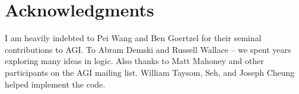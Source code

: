 \documentclass[12pt]{article}
\begin{document}
\section*{Acknowledgments}

I am heavily indebted to Pei Wang \cite{Wang2006} \cite{Wang2013} and Ben Goertzel \cite{Goertzel2011} for their seminal contributions to AGI.  To Abram Demski and Russell Wallace -- we spent years exploring many ideas in logic.  Also thanks to Matt Mahoney and other participants on the AGI mailing list.  William Taysom, Seh, and Joseph Cheung helped implement the code.



\onecolumn

\end{document}
